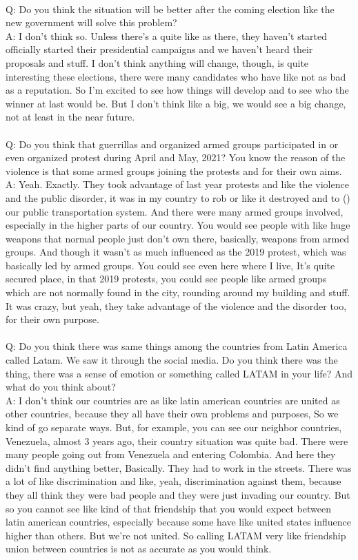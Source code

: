 \documentclass{phyasgn}\usepackage{nag}
\begin{document}
\\
Q: Do you think the situation will be better after the coming election like the new government will solve this problem?\\
A: I don't think so. Unless there's a quite like as there, they haven't started officially started their presidential campaigns and we haven't heard their proposals and stuff. I don't think anything will change, though, is quite interesting these elections, there were many candidates who have like not as bad as a reputation. So I'm excited to see how things will develop and to see who the winner at last would be. But I don't think like a big, we would see a big change, not at least in the near future.\\
\\
Q: Do you think that guerrillas and organized armed groups participated in or even organized protest during April and May, 2021? You know the reason of the violence is that some armed groups joining the protests and for their own aims. \\
A: Yeah. Exactly. They took advantage of last year protests and like the violence and the public disorder, it was in my country to rob or like it destroyed and to () our public transportation system. And there were many armed groups involved, especially in the higher parts of our country. You would see people with like huge weapons that normal people just don't own there, basically, weapons from armed groups. And though it wasn't as much influenced as the 2019 protest, which was basically led by armed groups. You could see even here where I live, It's quite secured place, in that 2019 protests, you could see people like armed groups which are not normally found in the city, rounding around my building and stuff. It was crazy, but yeah, they take advantage of the violence and the disorder too, for their own purpose.\\
\\
Q: Do you think there was same things among the countries from Latin America called Latam. We saw it through the social media. Do you think there was the thing, there was a sense of emotion or something called LATAM in your life? And what do you think about?\\
A: I don't think our countries are as like latin american countries are united as other countries, because they all have their own problems and purposes, So we kind of go separate ways. But, for example, you can see our neighbor countries, Venezuela, almost 3 years ago, their country situation was quite bad. There were many people going out from Venezuela and entering Colombia. And here they didn't find anything better, Basically. They had to work in the streets. There was a lot of like discrimination and like, yeah, discrimination against them, because they all think they were bad people and they were just invading our country. But so you cannot see like kind of that friendship that you would expect between latin american countries, especially because some have like united states influence higher than others. But we're not united. So calling LATAM very like friendship union between countries is not as accurate as you would think. \\
\end{document}
